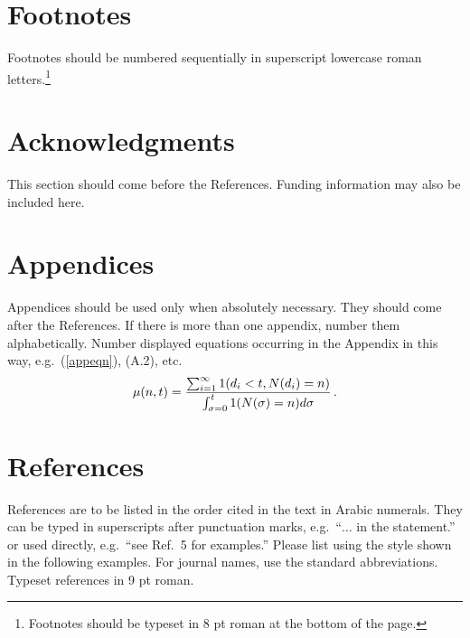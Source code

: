 \documentclass{ws-jmmb}
\begin{document}
\section{Footnotes}

Footnotes should be numbered sequentially in superscript
lowercase roman letters.\footnote{Footnotes should be
typeset in 8 pt roman at the bottom of the page.}


\section*{Acknowledgments}

This section should come before the References. Funding
information may also be included here.


\appendix

\section{Appendices}

Appendices should be used only when absolutely necessary. They should
come after the References. If there is more than one appendix, number
them alphabetically. Number displayed equations occurring in the
Appendix in this way, e.g.~(\ref{appeqn}), (A.2), etc.
\begin{equation}
\mu(n, t) = {\sum^\infty_{i=1} 1(d_i < t, N(d_i) = n) \over
\int^t_{\sigma=0} 1(N(\sigma) = n)d\sigma}\,.
\label{appeqn}
\end{equation}

\section*{References}

References are to be listed in the order cited in the text in Arabic
numerals. They can be typed in superscripts after punctuation marks,
e.g.~``$\ldots$ in the statement.\cite{joliat}'' or used directly,
e.g.~``see Ref.~5 for examples.'' Please list using the style shown in
the following examples.  For journal names, use the standard
abbreviations.  Typeset references in 9 pt roman.
\end{document}
